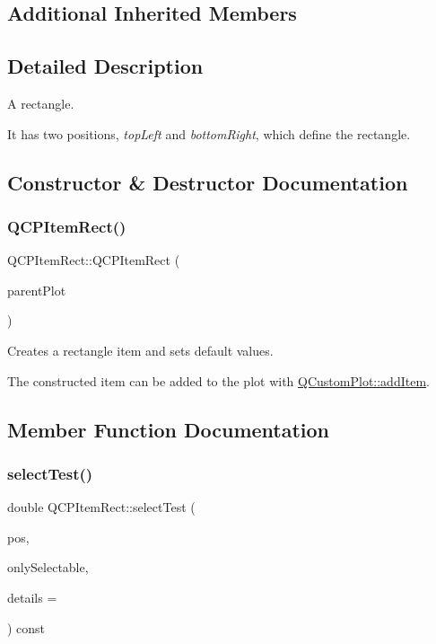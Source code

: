 \subsection*{Additional Inherited Members}


\subsection{Detailed Description}
A rectangle. 

 It has two positions, {\itshape top\+Left} and {\itshape bottom\+Right}, which define the rectangle. 

\subsection{Constructor \& Destructor Documentation}
\mbox{\label{class_q_c_p_item_rect_a412ad1579f7a1fba453d0fa28c496cbc}} 
\subsubsection{\texorpdfstring{Q\+C\+P\+Item\+Rect()}{QCPItemRect()}}
{\footnotesize\ttfamily Q\+C\+P\+Item\+Rect\+::\+Q\+C\+P\+Item\+Rect (\begin{DoxyParamCaption}\item[{\mbox{\hyperlink{class_q_custom_plot}{Q\+Custom\+Plot}} $\ast$}]{parent\+Plot }\end{DoxyParamCaption})}

Creates a rectangle item and sets default values.

The constructed item can be added to the plot with \mbox{\hyperlink{class_q_custom_plot_aa500620379262321685cb7a7674cbd2a}{Q\+Custom\+Plot\+::add\+Item}}. 

\subsection{Member Function Documentation}
\mbox{\label{class_q_c_p_item_rect_abe1a6091591d3bad5e4efab2331f99ec}} 
\subsubsection{\texorpdfstring{select\+Test()}{selectTest()}}
{\footnotesize\ttfamily double Q\+C\+P\+Item\+Rect\+::select\+Test (\begin{DoxyParamCaption}\item[{const Q\+PointF \&}]{pos,  }\item[{bool}]{only\+Selectable,  }\item[{Q\+Variant $\ast$}]{details = {} }\end{DoxyParamCaption}) const\hspace{0.3cm}{\ttfamily [virtual]}}

